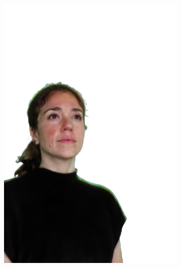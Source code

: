 \begin{figure}[ht]
\begin{subfigure}{0.08\linewidth}
        \includegraphics[width=\textwidth]{Figures/results/low/irene_rabbit/11_render.png}

\end{subfigure}
\end{figure}
